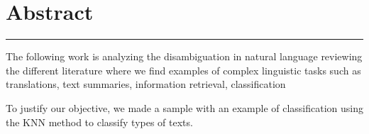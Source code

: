 \chapter*{Abstract}
\hrule \bigskip \vspace*{1cm}
The following work is analyzing the disambiguation in natural language reviewing the different literature where we find examples of complex linguistic tasks such as translations, text summaries, information retrieval, classification

To justify our objective, we made a sample with an example of classification using the KNN method to classify types of texts. 